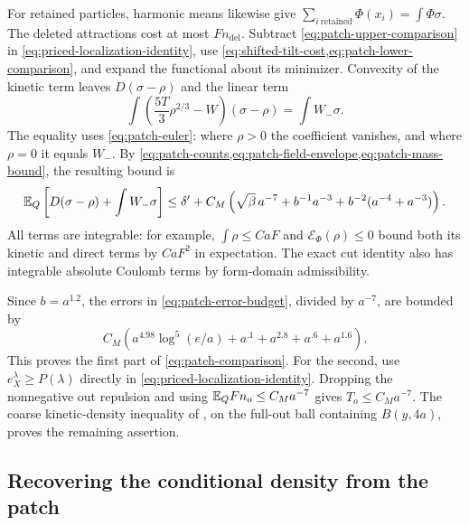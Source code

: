 For retained particles, harmonic means likewise give
$\sum_{i\ \mathrm{retained}}\Phi(x_i)=\int\Phi\sigma$.
The deleted attractions cost at most $Fn_{\mathrm{del}}$.
Subtract \cref{eq:patch-upper-comparison} in
\cref{eq:priced-localization-identity}, use
\cref{eq:shifted-tilt-cost,eq:patch-lower-comparison}, and expand the
functional about its minimizer.  Convexity of the kinetic term leaves
$D(\sigma-\rho)$ and the linear term
\[
 \int\left(\frac{5T}{3}\rho^{2/3}-W\right)(\sigma-\rho)
                 =\int W_-\sigma.
\]
The equality uses \cref{eq:patch-euler}: where $\rho>0$ the coefficient
vanishes, and where $\rho=0$ it equals $W_-$.
By \cref{eq:patch-counts,eq:patch-field-envelope,eq:patch-mass-bound},
the resulting bound is
\begin{equation}
 \mathbb E_Q\left[D(\sigma-\rho)+\int W_-\sigma\right]
 \leq\delta'+C_M\left(
       \sqrt\beta\,a^{-7}+b^{-1}a^{-3}
                       +b^{-2}(a^{-4}+a^{-3})\right).
 \label{eq:patch-error-budget}
\end{equation}
All terms are integrable: for example, $\int\rho\leq CaF$ and
$\mathcal E_\Phi(\rho)\leq0$ bound both its kinetic and direct terms
by $CaF^2$ in expectation.  The exact cut identity also has integrable
absolute Coulomb terms by form-domain admissibility.

Since $b=a^{1.2}$, the errors in
\cref{eq:patch-error-budget}, divided by $a^{-7}$, are bounded by
\[
 C_M\left(a^{4.98}\log^5(e/a)+a^{.1}
                          +a^{2.8}+a^{.6}+a^{1.6}\right).
\]
This proves the first part of \cref{eq:patch-comparison}.
For the second, use $e_X^\lambda\geq P(\lambda)$ directly in
\cref{eq:priced-localization-identity}.  Dropping the nonnegative out
repulsion and using $\mathbb E_QFn_o\leq C_Ma^{-7}$ gives $T_o\leq C_Ma^{-7}$.
The coarse kinetic-density inequality of
\cite[\FLocalization]{Foundation}, on the full-out ball containing
$B(y,4a)$, proves the remaining assertion.

\subsection{Recovering the conditional density from the patch}

